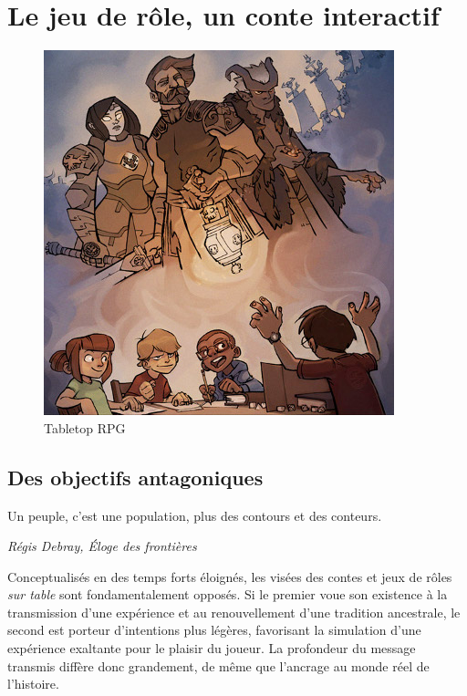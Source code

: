\section{Le jeu de rôle, un conte interactif}

\begin{figure}[h!]
    \centering
    \includegraphics[width=0.80\linewidth]{img/rpg_tabletop2.jpg}
    \caption{Tabletop RPG}
\end{figure}


\subsection{Des objectifs antagoniques}

\begin{shadequote}
Un peuple, c'est une population, plus des contours et des conteurs. \par\emph{Régis Debray, Éloge des frontières}
\end{shadequote}

Conceptualisés en des temps forts éloignés, les visées des contes et jeux de rôles \textit{sur table} sont fondamentalement opposés. Si le premier voue son existence à la transmission d'une expérience et au renouvellement d'une tradition ancestrale, le second est porteur d'intentions plus légères, favorisant la simulation d'une expérience exaltante pour le plaisir du joueur. La profondeur du message transmis diffère donc grandement, de même que l'ancrage au monde réel de l'histoire.

